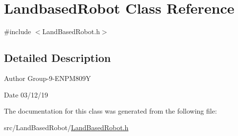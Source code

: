\hypertarget{class_landbased_robot}{}\section{Landbased\+Robot Class Reference}
\label{class_landbased_robot}


{\ttfamily \#include $<$Land\+Based\+Robot.\+h$>$}



\subsection{Detailed Description}
\begin{DoxyAuthor}{Author}
Group-\/9-\/\+E\+N\+P\+M809Y 
\end{DoxyAuthor}
\begin{DoxyDate}{Date}
03/12/19 
\end{DoxyDate}


The documentation for this class was generated from the following file\+:\begin{DoxyCompactItemize}
\item 
src/\+Land\+Based\+Robot/\hyperlink{_land_based_robot_8h}{Land\+Based\+Robot.\+h}\end{DoxyCompactItemize}
